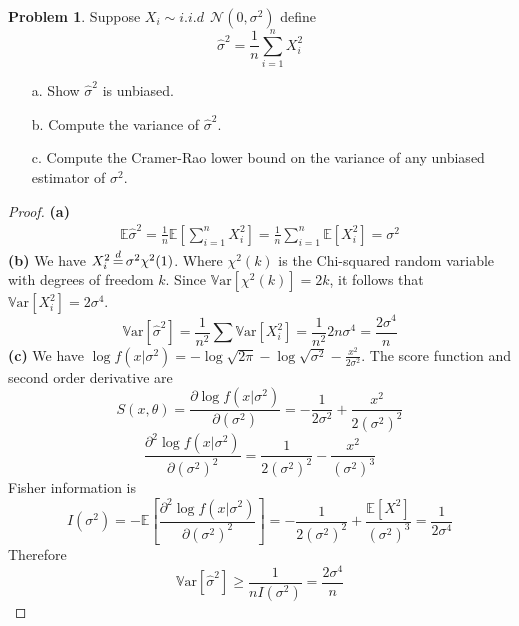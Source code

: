 \documentclass[a4paper, 10pt]{article}
\theoremstyle{definition}
\newtheorem{problem}{Problem}
\theoremstyle{hSol}
\begin{document}
\begin{problem} Suppose $X_i \sim i.i.d~~\mathcal{N}(0,\sigma^2)$ define 
$$
\hat{\sigma}^2 = \frac{1}{n} \sum_{i=1}^n X_i^2
$$
\begin{itemize}
  \item[a.] Show $\hat{\sigma}^2$ is unbiased.
  \item[b.] Compute the variance of $\hat{\sigma}^2$.
  \item[c.] Compute the Cramer-Rao lower bound on the variance of any unbiased estimator of $\sigma^2$.
\end{itemize}
\end{problem}
\begin{proof} \textbf{(a)}
\begin{equation}
  \begin{split}
    \mathbb{E}\hat{\sigma}^2 = \frac{1}{n}\mathbb{E}\left[\sum_{i=1}^n X_i^2\right] = \frac{1}{n}\sum_{i=1}^n \mathbb{E}\left[X_i^2\right] = \sigma^2
  \end{split}
\end{equation}
\textbf{(b)} We have $X_i^2 \,{\buildrel d \over =}\, \sigma^2 \chi^2(1)$. Where $\chi^2(k)$ is the Chi-squared random variable with degrees of freedom $k$. Since $\mathrm{\mathbb{V}ar}[\chi^2(k)]=2k$, it follows that $\mathrm{\mathbb{V}ar}[X_i^2] = 2\sigma^4$.
\begin{equation}
  \mathrm{\mathbb{V}ar}\left[\hat{\sigma}^2\right] = \frac{1}{n^2}\sum \mathrm{\mathbb{V}ar}\left[X_i^2\right] = \frac{1}{n^2} 2n\sigma^4 = \frac{2\sigma^4}{n}
\end{equation}
\textbf{(c)} We have $\log f(x|\sigma^2) = -\log \sqrt{2\pi} - \log \sqrt{\sigma^2} - \frac{x^2}{2\sigma^2}$. The score function and second order derivative are
\begin{equation}
  S(x,\theta) = \frac{\partial \log f(x|\sigma^2)}{\partial (\sigma^2)} = -\frac{1}{2\sigma^2} + \frac{x^2}{2(\sigma^2)^2}
\end{equation}
\begin{equation}
  \frac{\partial^2 \log f(x|\sigma^2)}{\partial (\sigma^2)^2} =\frac{1}{2(\sigma^2)^2} - \frac{x^2}{(\sigma^2)^3}
\end{equation}
Fisher information is
\begin{equation}
  I(\sigma^2) = -\mathbb{E}\left[\frac{\partial^2 \log f(x|\sigma^2)}{\partial (\sigma^2)^2}\right] = -\frac{1}{2(\sigma^2)^2} + \frac{\mathbb{E}\left[X^2\right]}{(\sigma^2)^3} = \frac{1}{2\sigma^4}
\end{equation}
Therefore
$$
\mathrm{\mathbb{V}ar}\left[\hat{\sigma}^2\right] \geq \frac{1}{nI(\sigma^2)} = \frac{2\sigma^4}{n}
$$
\end{proof}
\end{document}
